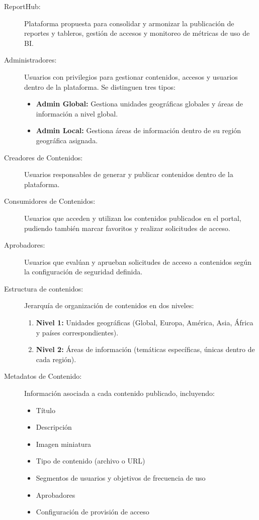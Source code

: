 \begin{description}

\item[ReportHub:] Plataforma propuesta para consolidar y armonizar la publicación de reportes y tableros, gestión de accesos y monitoreo de métricas de uso de BI.

\item[Administradores:] Usuarios con privilegios para gestionar contenidos, accesos y usuarios dentro de la plataforma. Se distinguen tres tipos:
    \begin{itemize}
        \item \textbf{Admin Global:} Gestiona unidades geográficas globales y áreas de información a nivel global.
        \item \textbf{Admin Local:} Gestiona áreas de información dentro de su región geográfica asignada.
    \end{itemize}

\item[Creadores de Contenidos:] Usuarios responsables de generar y publicar contenidos dentro de la plataforma.

\item[Consumidores de Contenidos:] Usuarios que acceden y utilizan los contenidos publicados en el portal, pudiendo también marcar favoritos y realizar solicitudes de acceso.

\item[Aprobadores:] Usuarios que evalúan y aprueban solicitudes de acceso a contenidos según la configuración de seguridad definida.

\item[Estructura de contenidos:] Jerarquía de organización de contenidos en dos niveles:
    \begin{enumerate}
        \item \textbf{Nivel 1:} Unidades geográficas (Global, Europa, América, Asia, África y países correspondientes).
        \item \textbf{Nivel 2:} Áreas de información (temáticas específicas, únicas dentro de cada región).
    \end{enumerate}

\item[Metadatos de Contenido:] Información asociada a cada contenido publicado, incluyendo:
    \begin{itemize}
        \item Título
        \item Descripción
        \item Imagen miniatura
        \item Tipo de contenido (archivo o URL)
        \item Segmentos de usuarios y objetivos de frecuencia de uso
        \item Aprobadores
        \item Configuración de provisión de acceso
    \end{itemize}


\end{description}
